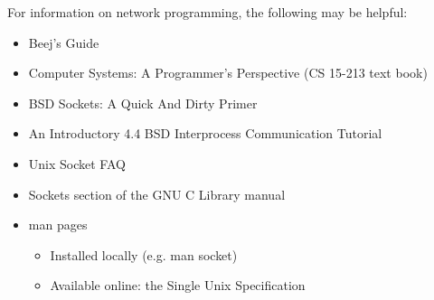 
For information on network programming, the following may be helpful:

\begin{itemize}
    \item Beej's Guide~\cite{beej}
	\item Computer Systems: A Programmer's Perspective (CS 15-213 text book)\cite{Book:CSAPP}
	\item BSD Sockets: A Quick And Dirty Primer\cite{BSD:Sockets}
	\item An Introductory 4.4 BSD Interprocess Communication Tutorial\cite{BSD:IPC}
	\item Unix Socket FAQ\cite{FAQ:Sockets}
	\item Sockets section of the GNU C Library manual\cite{Manual:libc}
	\item man pages
		\begin{itemize}
			\item Installed locally (e.g. man socket)
			\item Available online: the Single Unix Specification\cite{Spec:Unix}
		\end{itemize}
\end{itemize}


